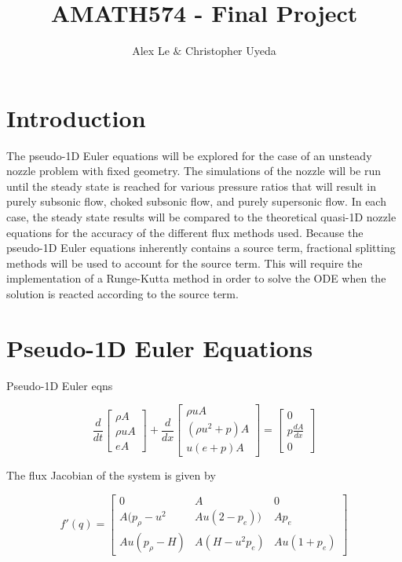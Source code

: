 \documentclass{article}%
\title{AMATH574 - Final Project}
\author{Alex Le $\&$ Christopher Uyeda}
\numberwithin{equation}{section}
\begin{document}
\maketitle

\section{Introduction}
The pseudo-1D Euler equations will be explored for the case of an unsteady nozzle problem with fixed geometry. The simulations of the nozzle will be run until the steady state is reached for various pressure ratios that will result in purely subsonic flow, choked subsonic flow, and purely supersonic flow. In each case, the steady state results will be compared to the theoretical quasi-1D nozzle equations for the accuracy of the different flux methods used. Because the pseudo-1D Euler equations inherently contains a source term, fractional splitting methods will be used to account for the source term. This will require the implementation of a Runge-Kutta method in order to solve the ODE when the solution is reacted according to the source term.

\section{Pseudo-1D Euler Equations}
Pseudo-1D Euler eqns

\begin{equation}
\frac{d}{dt} \left[ \begin{array}{c} \rho A \\ \rho u A \\ e A \end{array} \right] + \frac{d}{dx} \left[ \begin{array}{c} \rho u A \\ (\rho u^2 + p) A \\ u(e + p)A \end{array} \right] = \left[ \begin{array}{c} 0 \\ p \frac{dA}{dx} \\ 0 \end{array} \right] \label{psuedoeuler}
\end{equation}

The flux Jacobian of the system is given by

\begin{equation}
f'(q) = \left[ \begin{array}{ccc} 0 & A & 0 \\ A (p_{\rho} - u^2 & A u(2 - p_e)) & A p_e \\ A u(p_\rho - H) & A (H - u^2 p_e)  & A u(1 + p_e) \end{array} \right] \label{1deulerjacobian}
\end{equation}
\end{document}
